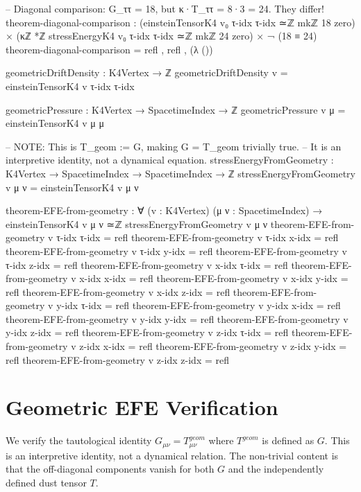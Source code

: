\documentclass[11pt,a4paper]{book}
\def\text#1{#1}%
\begin{document}
\begin{code}
-- Diagonal comparison: G_ττ = 18, but κ·T_ττ = 8·3 = 24. They differ!
theorem-diagonal-comparison : 
  (einsteinTensorK4 v₀ τ-idx τ-idx ≃ℤ mkℤ 18 zero) × 
  (κℤ *ℤ stressEnergyK4 v₀ τ-idx τ-idx ≃ℤ mkℤ 24 zero) ×
  ¬ (18 ≡ 24)
theorem-diagonal-comparison = refl , refl , (λ ())

geometricDriftDensity : K4Vertex → ℤ
geometricDriftDensity v = einsteinTensorK4 v τ-idx τ-idx

geometricPressure : K4Vertex → SpacetimeIndex → ℤ
geometricPressure v μ = einsteinTensorK4 v μ μ

-- NOTE: This is T_geom := G, making G = T_geom trivially true.
-- It is an interpretive identity, not a dynamical equation.
stressEnergyFromGeometry : K4Vertex → SpacetimeIndex → SpacetimeIndex → ℤ
stressEnergyFromGeometry v μ ν = 
  einsteinTensorK4 v μ ν

theorem-EFE-from-geometry : ∀ (v : K4Vertex) (μ ν : SpacetimeIndex) →
  einsteinTensorK4 v μ ν ≃ℤ stressEnergyFromGeometry v μ ν
theorem-EFE-from-geometry v τ-idx τ-idx = refl
theorem-EFE-from-geometry v τ-idx x-idx = refl
theorem-EFE-from-geometry v τ-idx y-idx = refl
theorem-EFE-from-geometry v τ-idx z-idx = refl
theorem-EFE-from-geometry v x-idx τ-idx = refl
theorem-EFE-from-geometry v x-idx x-idx = refl
theorem-EFE-from-geometry v x-idx y-idx = refl
theorem-EFE-from-geometry v x-idx z-idx = refl
theorem-EFE-from-geometry v y-idx τ-idx = refl
theorem-EFE-from-geometry v y-idx x-idx = refl
theorem-EFE-from-geometry v y-idx y-idx = refl
theorem-EFE-from-geometry v y-idx z-idx = refl
theorem-EFE-from-geometry v z-idx τ-idx = refl
theorem-EFE-from-geometry v z-idx x-idx = refl
theorem-EFE-from-geometry v z-idx y-idx = refl
theorem-EFE-from-geometry v z-idx z-idx = refl
\end{code}

\section{Geometric EFE Verification}

We verify the tautological identity $G_{\mu\nu} = T^{\text{geom}}_{\mu\nu}$
where $T^{\text{geom}}$ is defined as $G$. This is an interpretive identity,
not a dynamical relation. The non-trivial content is that the off-diagonal
components vanish for both $G$ and the independently defined dust tensor $T$.
\end{document}
